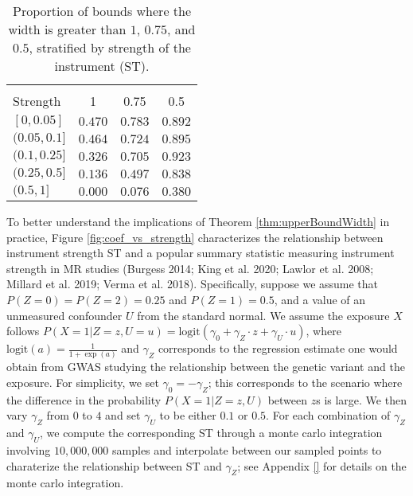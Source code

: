\documentclass[
]{article}
\theoremstyle{plain}
\begin{document}
\begin{table}[H]
  \begin{center}
  \caption{Proportion of bounds where the width is greater than $1$, $0.75$, and $0.5$, stratified by strength of the instrument (ST).}
  \label{tab:prop_of_biv_widths_large}
  
\begin{tabular}{lccc}
\toprule
{} &  \\
\cmidrule(l{3pt}r{3pt}){2-4}
Strength & 1 & 0.75 & 0.5\\
\midrule
$[0,0.05]$ & $0.470$ & $0.783$ & $0.892$\\
$(0.05,0.1]$ & $0.464$ & $0.724$ & $0.895$\\
$(0.1,0.25]$ & $0.326$ & $0.705$ & $0.923$\\
$(0.25,0.5]$ & $0.136$ & $0.497$ & $0.838$\\
$(0.5,1]$ & $0.000$ & $0.076$ & $0.380$\\
\bottomrule
\end{tabular}


  \end{center}
\end{table}

To better understand the implications of Theorem \ref{thm:upperBoundWidth} in practice, Figure \ref{fig:coef_vs_strength} characterizes the relationship between instrument strength ST and a popular summary statistic measuring instrument strength in MR studies (Burgess 2014; King et al. 2020; Lawlor et al. 2008; Millard et al. 2019; Verma et al. 2018). Specifically, suppose we assume that \(P(Z = 0) = P(Z = 2) = 0.25\) and \(P(Z = 1) = 0.5\), and a value of an unmeasured confounder \(U\) from the standard normal. We assume the exposure \(X\) follows \(P(X = 1 | Z = z, U = u) = \text{logit}(\gamma_0 + \gamma_Z\cdot z + \gamma_U \cdot u)\), where \(\text{logit}(a) = \frac{1}{1+\exp(a)}\) and \(\gamma_Z\) corresponds to the regression estimate one would obtain from GWAS studying the relationship between the genetic variant and the exposure. For simplicity, we set \(\gamma_0 = -\gamma_Z\); this corresponds to the scenario where the difference in the probability \(P(X = 1 | Z = z, U)\) between \(z\)s is large. We then vary \(\gamma_Z\) from \(0\) to \(4\) and set \(\gamma_U\) to be either \(0.1\) or \(0.5\). For each combination of \(\gamma_Z\) and \(\gamma_U\), we compute the corresponding ST through a monte carlo integration involving \(10,000,000\) samples and interpolate between our sampled points to charaterize the relationship between ST and \(\gamma_Z\); see Appendix \ref{} for details on the monte carlo integration.
\end{document}
